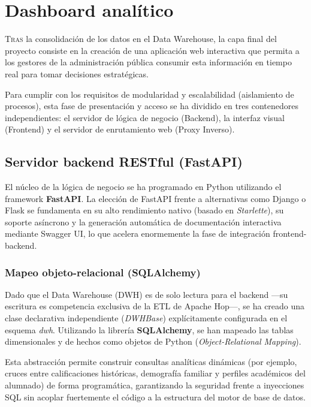 \chapter{Dashboard analítico}
\label{chap:desarrollo_dashboard}

\lettrine{T}{ras} la consolidación de los datos en el Data Warehouse, la capa final del proyecto consiste en la creación de una aplicación web interactiva que permita a los gestores de la administración pública consumir esta información en tiempo real para tomar decisiones estratégicas.

Para cumplir con los requisitos de modularidad y escalabilidad (aislamiento de procesos), esta fase de presentación y acceso se ha dividido en tres contenedores independientes: el servidor de lógica de negocio (Backend), la interfaz visual (Frontend) y el servidor de enrutamiento web (Proxy Inverso).

\section{Servidor backend RESTful (FastAPI)}

El núcleo de la lógica de negocio se ha programado en Python utilizando el framework \textbf{FastAPI}. La elección de FastAPI frente a alternativas como Django o Flask se fundamenta en su alto rendimiento nativo (basado en \textit{Starlette}), su soporte asíncrono y la generación automática de documentación interactiva mediante Swagger UI, lo que acelera enormemente la fase de integración frontend-backend.

\subsection{Mapeo objeto-relacional (SQLAlchemy)}

Dado que el Data Warehouse (DWH) es de solo lectura para el backend —su escritura es competencia exclusiva de la ETL de Apache Hop—, se ha creado una clase declarativa independiente (\textit{DWHBase}) explícitamente configurada en el esquema \textit{dwh}. Utilizando la librería \textbf{SQLAlchemy}, se han mapeado las tablas dimensionales y de hechos como objetos de Python (\textit{Object-Relational Mapping}). 

Esta abstracción permite construir consultas analíticas dinámicas (por ejemplo, cruces entre calificaciones históricas, demografía familiar y perfiles académicos del alumnado) de forma programática, garantizando la seguridad frente a inyecciones SQL sin acoplar fuertemente el código a la estructura del motor de base de datos.


